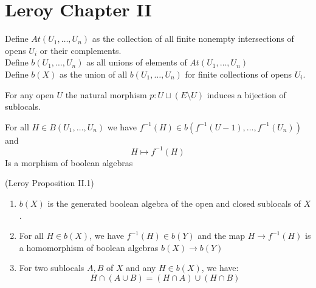 

\chapter{Leroy Chapter II}\label{sec:leroy-chapter-ii}
\begin{definition}
    \label{def:induced_boolean_algebra}
    Define $At(U_1,\dots,U_n)$ as the collection of all finite nonempty intersections of opens $U_i$ or their complements. \\
    Define $b(U_1,\dots,U_n)$ as all unions of elements of $At(U_1,\dots,U_n)$\\
    Define $b(X)$ as the union of all $b(U_1,\dots,U_n)$ for finite collections of opens $U_i$.
\end{definition}

\begin{lemma}
    \label{lem:sublocals_and_decompositions}
    For any open $U$ the natural morphism $p : U \sqcup (E \setminus U)$ induces a bijection of sublocals.
\end{lemma}

\begin{lemma}
    \label{lem:induced_morphism_of_boolean_algebras}
    For all $H \in B(U_1,\dots,U_n)$ we have $f^{-1}(H) \in b(f^{-1}(U-1),\dots,f^{-1}(U_n))$ and \[H \mapsto f^{-1}(H)    \]
    Is a morphism of boolean algebras
\end{lemma}

\begin{proposition}
(Leroy Proposition II.1)
    \label{prop:boolean_algebra}
    \begin{enumerate}
        \item $b(X)$ is the generated boolean algebra of the open and closed sublocals of $X$.
        \item For all $H \in b(X)$, we have $f^{-1}(H) \in b(Y)$ and the map $H \to f^{-1}(H)$ is a homomorphism of boolean algebras $b(X) \to b(Y)$
        \item For two sublocals $A, B$ of $X$ and any $H \in b(X)$, we have: \[H \cap (A \cup B ) = (H \cap A) \cup (H \cap B)\]
    \end{enumerate}
\end{proposition}

